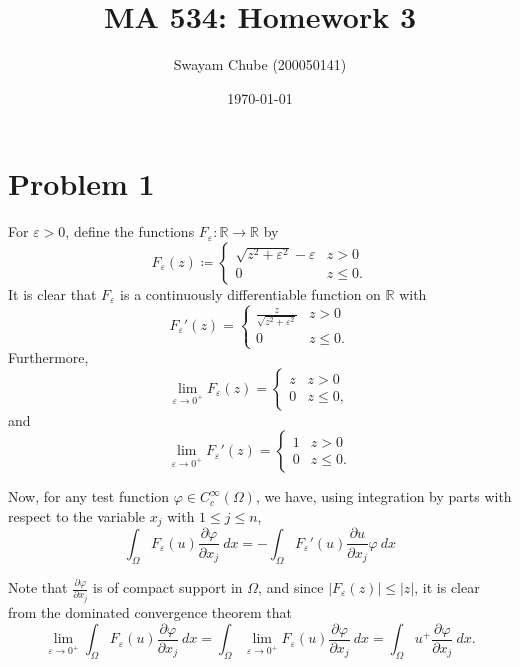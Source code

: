 \documentclass[10pt]{amsart}
\title{MA 534: Homework 3}
\author{Swayam Chube (200050141)}
\date{\today}
\theoremstyle{thmstyle}
\theoremstyle{defstyle}
\newcommand{\R}{\mathbb{R}}
\renewcommand{\le}{\leqslant}
\begin{document}
\maketitle 

\section{Problem 1}

For $\varepsilon > 0$, define the functions $F_\varepsilon: \R\to\R$ by 
\begin{equation*}
    F_\varepsilon(z) \coloneq
    \begin{cases}
        \sqrt{z^2 + \varepsilon^2} - \varepsilon & z > 0\\
        0 & z\le 0.
    \end{cases}
\end{equation*}
It is clear that $F_\varepsilon$ is a continuously differentiable function on $\R$ with 
\begin{equation*}
    F_\varepsilon'(z) = 
    \begin{cases}
        \frac{z}{\sqrt{z^2 + \varepsilon^2}} & z > 0\\
        0 & z\le 0.
    \end{cases}
\end{equation*}
Furthermore, 
\begin{equation*}
    \lim_{\varepsilon\to 0^+} F_\varepsilon(z) = 
    \begin{cases}
        z & z > 0\\
        0 & z\le 0,
    \end{cases}
\end{equation*}
and 
\begin{equation*}
    \lim_{\varepsilon\to 0^+} F_\varepsilon'(z) = 
    \begin{cases}
        1 & z > 0\\
        0 & z\le 0.
    \end{cases}
\end{equation*}

Now, for any test function $\varphi\in C_c^\infty(\Omega)$, we have, using integration by parts with respect to the variable $x_j$ with $1\le j\le n$, 
\begin{equation*}
    \int_{\Omega}F_\varepsilon(u)\frac{\partial\varphi}{\partial x_j}~dx = -\int_{\Omega}F_\varepsilon'(u)\frac{\partial u}{\partial x_j}\varphi~dx
\end{equation*}

Note that $\frac{\partial\varphi}{\partial x_j}$ is of compact support in $\Omega$, and since $|F_\varepsilon(z)|\le |z|$, it is clear from the dominated convergence theorem that 
\begin{equation*}
    \lim_{\varepsilon\to 0^+}\int_\Omega F_\varepsilon(u)\frac{\partial\varphi}{\partial x_j}~dx = \int_\Omega\lim_{\varepsilon\to 0^+} F_\varepsilon(u)\frac{\partial\varphi}{\partial x_j}~dx = \int_\Omega u^+\frac{\partial\varphi}{\partial x_j}~dx.
\end{equation*}
\end{document}
